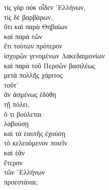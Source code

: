 {\large
\begin{greek}
\noindent τίς γὰρ οὐκ οἶδεν ῾Ελλήνων, \\
τίς δὲ βαρβάρων, \\
\tabto{2em} ὅτι καὶ παρὰ Θηβαίων \\

\tabto{2em} καὶ παρὰ τῶν \\
\tabto{4em} ἔτι τούτων πρότερον \\
\tabto{2em} ἰσχυρῶν γενομένων Λακεδαιμονίων\\
\tabto{2em} καὶ παρὰ τοῦ Περσῶν βασιλέως \\
\tabto{4em} μετὰ πολλῆς χάριτος \\
\tabto{2em} τοῦτ' \\
\tabto{4em} ἂν ἀσμένως ἐδόθη \\
\tabto{6em} τῇ πόλει, \\
\tabto{8em} ὅ τι βούλεται \\
\tabto{6em} λαβούσῃ \\
\tabto{6em} καὶ τὰ ἑαυτῆς ἐχούσῃ \\
\tabto{2em} τὸ κελευόμενον ποιεῖν \\
\tabto{2em} καὶ ἐᾶν \\
\tabto{4em} ἕτερον \\
\tabto{6em} τῶν ῾Ελλήνων \\
\tabto{4em} προεστάναι; \\

\end{greek}
}

